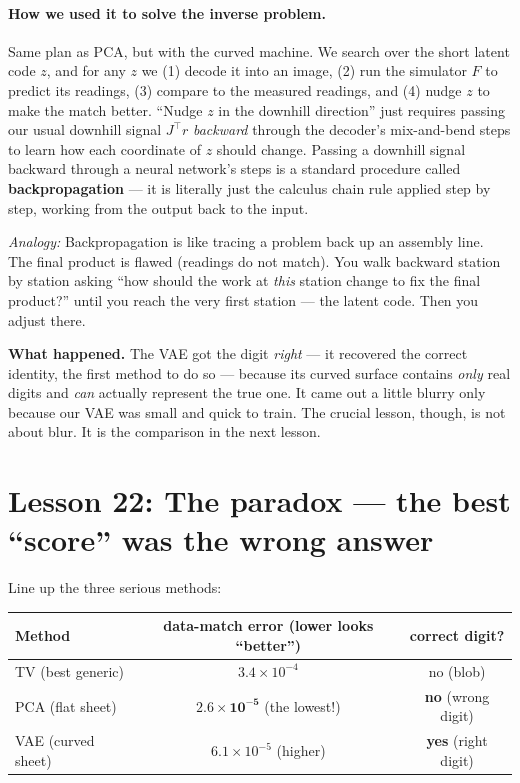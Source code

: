 \documentclass[11pt]{article}
\newcommand{\analogy}[1]{\par\smallskip\noindent\textit{Analogy:} #1\par\smallskip}
\begin{document}
\paragraph{How we used it to solve the inverse problem.} Same plan as PCA, but
with the curved machine. We search over the short latent code $z$, and for any
$z$ we (1) decode it into an image, (2) run the simulator $F$ to predict its
readings, (3) compare to the measured readings, and (4) nudge $z$ to make the
match better. ``Nudge $z$ in the downhill direction'' just requires passing
our usual downhill signal $J^\top r$ \emph{backward} through the decoder's
mix-and-bend steps to learn how each coordinate of $z$ should change. Passing
a downhill signal backward through a neural network's steps is a standard
procedure called \textbf{backpropagation} --- it is literally just the calculus
chain rule applied step by step, working from the output back to the input.

\analogy{Backpropagation is like tracing a problem back up an assembly line.
The final product is flawed (readings do not match). You walk backward
station by station asking ``how should the work at \emph{this} station change
to fix the final product?'' until you reach the very first station --- the
latent code. Then you adjust there.}

\textbf{What happened.} The VAE got the digit \emph{right} --- it recovered the
correct identity, the first method to do so --- because its curved surface
contains \emph{only} real digits and \emph{can} actually represent the true
one. It came out a little blurry only because our VAE was small and quick to
train. The crucial lesson, though, is not about blur. It is the comparison in
the next lesson.

\section{Lesson 22: The paradox --- the best ``score'' was the wrong answer}

Line up the three serious methods:

\begin{center}
\begin{tabular}{lcc}
\toprule
Method & data-match error (lower looks ``better'') & correct digit? \\
\midrule
TV (best generic) & $3.4\times10^{-4}$ & no (blob) \\
PCA (flat sheet) & $\mathbf{2.6\times10^{-5}}$ (the lowest!) & \textbf{no} (wrong digit) \\
VAE (curved sheet) & $6.1\times10^{-5}$ (higher) & \textbf{yes} (right digit) \\
\bottomrule
\end{tabular}
\end{center}
\end{document}
